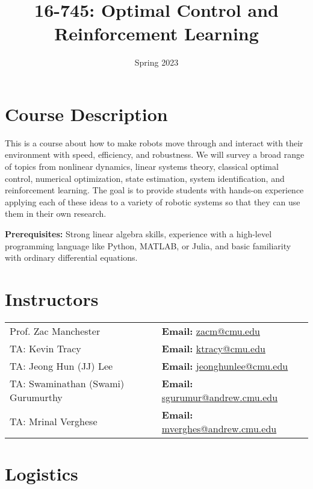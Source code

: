 \documentclass[11pt,letterpaper]{article}
\title{16-745: Optimal Control and Reinforcement Learning}
\author{Spring 2023}
\date{}
\begin{document}
\maketitle

\section*{Course Description}

This is a course about how to make robots move through and interact with their environment with speed, efficiency, and robustness. We will survey a broad range of topics from nonlinear dynamics, linear systems theory, classical optimal control, numerical optimization, state estimation, system identification, and reinforcement learning. The goal is to provide students with hands-on experience applying each of these ideas to a variety of robotic systems so that they can use them in their own research.

\medskip
\noindent
\textbf{Prerequisites:} Strong linear algebra skills, experience with a high-level programming language like Python, MATLAB, or Julia, and basic familiarity with ordinary differential equations.

\section*{Instructors}

\begin{center}
\begin{tabular}{l l}
	Prof. Zac Manchester & \textbf{Email:} \href{mailto:zacm@cmu.edu}{zacm@cmu.edu} \\
	TA: Kevin Tracy & \textbf{Email:} \href{mailto:ktracy@cmu.edu}{ktracy@cmu.edu}
	\\
	TA: Jeong Hun (JJ) Lee & \textbf{Email:} \href{mailto:jeonghunlee@cmu.edu}{jeonghunlee@cmu.edu}
	\\
	TA: Swaminathan (Swami) Gurumurthy & \textbf{Email:} \href{sgurumur@andrew.cmu.edu}{sgurumur@andrew.cmu.edu}
	\\
	TA: Mrinal Verghese & \textbf{Email:} \href{mverghes@andrew.cmu.edu}{mverghes@andrew.cmu.edu}
\end{tabular}
\end{center}

\section*{Logistics}
\end{document}
